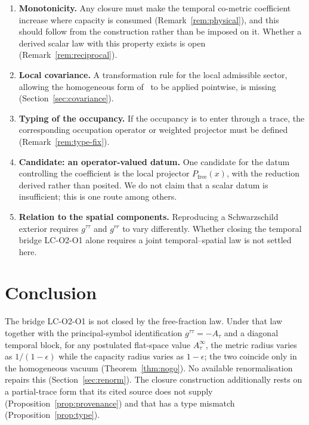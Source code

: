 \documentclass[12pt,a4paper]{article}
\theoremstyle{remark}
\theoremstyle{definition}
\begin{document}
    \begin{enumerate}
      \item \textbf{Monotonicity.} Any closure must make the temporal co-metric coefficient increase
        where capacity is consumed (Remark~\ref{rem:physical}), and this should follow from the
        construction rather than be imposed on it.
        Whether a derived scalar law with this property exists is open
        (Remark~\ref{rem:reciprocal}).
      \item \textbf{Local covariance.} A transformation rule for the local admissible sector, allowing
        the homogeneous form of~\cite{Beau2026q11} to be applied pointwise, is missing
        (Section~\ref{sec:covariance}).
      \item \textbf{Typing of the occupancy.} If the occupancy is to enter through a trace, the
        corresponding occupation operator or weighted projector must be defined
        (Remark~\ref{rem:type-fix}).
      \item \textbf{Candidate: an operator-valued datum.} One candidate for the datum controlling the
        coefficient is the local projector $P_{\mathrm{free}}(x)$, with the reduction derived rather
        than posited.
        We do not claim that a scalar datum is insufficient; this is one route among others.
      \item \textbf{Relation to the spatial components.} Reproducing a Schwarzschild exterior requires
        $g^{\tau\tau}$ and $g^{rr}$ to vary differently.
        Whether closing the temporal bridge LC-O2-O1 alone requires a joint temporal--spatial law is
        not settled here.
    \end{enumerate}

  \section{Conclusion}
    \label{sec:conclusion}

    The bridge LC-O2-O1 is not closed by the free-fraction law.
    Under that law together with the principal-symbol identification $g^{\tau\tau}=-A_{\tau}$ and a diagonal
    temporal block, for any postulated flat-space value $A_{\tau}^{\infty}$, the metric radius varies as
    $1/(1-\epsilon)$ while the capacity radius varies as $1-\epsilon$; the two coincide only in the homogeneous vacuum
    (Theorem~\ref{thm:nogo}).
    No available renormalisation repairs this (Section~\ref{sec:renorm}).
    The closure construction additionally rests on a partial-trace form that its cited source does not
    supply (Proposition~\ref{prop:provenance}) and that has a type mismatch
    (Proposition~\ref{prop:type}).
\end{document}
